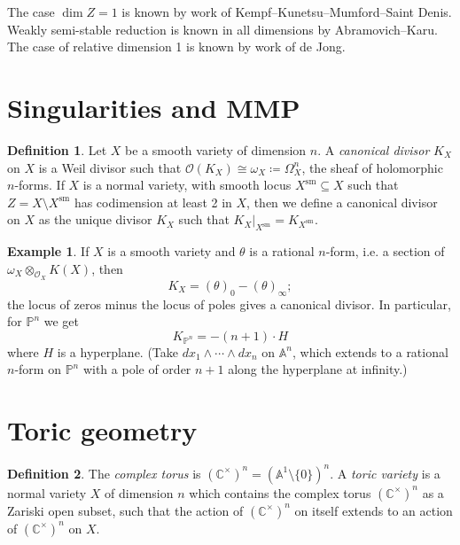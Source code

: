 \documentclass{article}
\theoremstyle{definition}
\newtheorem*{definition}{Definition}
\newtheorem*{example}{Example}
\newcommand{\sm}{\mathrm{sm}}
\renewcommand{\O}{\mathcal{O}}
\newcommand{\A}{\mathbb{A}}
\renewcommand{\P}{\mathbb{P}}
\newcommand{\C}{\mathbb{C}}
\begin{document}
The case $\dim Z=1$ is known by work of Kempf--Kunetsu--Mumford--Saint Denis.
Weakly semi-stable reduction is known in all dimensions by Abramovich--Karu.
The case of relative dimension 1 is known by work of de Jong.

\section*{Singularities and MMP}

\begin{definition}
    Let $X$ be a smooth variety of dimension $n$. A \emph{canonical divisor}
    $K_X$ on $X$ is a Weil divisor such that
    $\O(K_X)\cong\omega_X\coloneq\Omega_X^n$, the sheaf of holomorphic
    $n$-forms. If $X$ is a normal variety, with smooth locus $X^\sm\subseteq X$
    such that $Z=X\setminus X^\sm$ has codimension at least 2 in $X$, then we
    define a canonical divisor on $X$ as the unique divisor $K_X$ such that
    $K_X|_{X^\sm}=K_{X^\sm}$.
\end{definition}

\begin{example}
    If $X$ is a smooth variety and $\theta$ is a rational $n$-form, i.e. a
    section of $\omega_X\otimes_{\O_X}K(X)$, then
    \begin{equation*}
        K_X = (\theta)_0 - (\theta)_\infty;
    \end{equation*}
    the locus of zeros minus the locus of poles gives a canonical divisor. In
    particular, for $\P^n$ we get
    \begin{equation*}
        K_{\P^n} = -(n+1)\cdot H
    \end{equation*}
    where $H$ is a hyperplane. (Take $dx_1\wedge\cdots\wedge dx_n$ on $\A^n$,
    which extends to a rational $n$-form on $\P^n$ with a pole of order $n+1$
    along the hyperplane at infinity.)
\end{example}

\section*{Toric geometry}

\begin{definition}
    The \emph{complex torus} is $(\C^\times)^n=(\A^1\setminus\{0\})^n$. A
    \emph{toric variety} is a normal variety $X$ of dimension $n$ which contains
    the complex torus $(\C^\times)^n$ as a Zariski open subset, such that the
    action of $(\C^\times)^n$ on itself extends to an action of $(\C^\times)^n$
    on $X$.
\end{definition}
\end{document}
